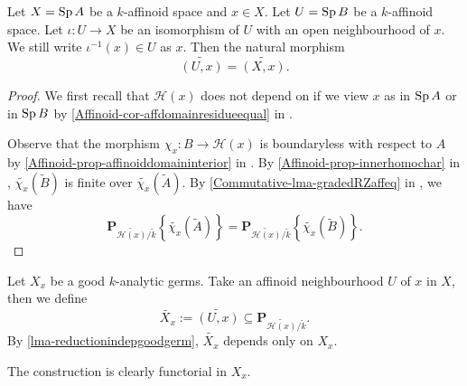 \begin{lemma}\label{lma-reductionindepgoodgerm}
    Let $X=\operatorname{Sp} A$ be a $k$-affinoid space and $x\in X$. Let $U=\operatorname{Sp} B$ be a $k$-affinoid space. Let $\iota:U\rightarrow X$ be an isomorphism of $U$ with an open neighbourhood of $x$.
    We still write $\iota^{-1}(x)\in U$ as $x$.
    Then the natural morphism
    \[
        \widetilde{(U,x)}=\widetilde{(X,x)}.     
    \]
\end{lemma}
\begin{proof}
    We first recall that  $\mathscr{H}(x)$ does not depend on if we view $x$ as in $\operatorname{Sp} A$ or in $\operatorname{Sp} B$  by \cref{Affinoid-cor-affdomainresidueequal} in . 

    Observe that the morphism $\chi_x:B\rightarrow \mathscr{H}(x)$ is boundaryless with respect to $A$ by \cref{Affinoid-prop-affinoiddomaininterior} in . By \cref{Affinoid-prop-innerhomochar}  in , $\widetilde{\chi_x}(\tilde{B})$ is finite over $\widetilde{\chi_x}(\tilde{A})$. By \cref{Commutative-lma-gradedRZaffeq} in , we have
    \[
        \mathbf{P}_{\widetilde{\mathscr{H}(x)}/\tilde{k}}\left\{ \widetilde{\chi_x}(\tilde{A})\right\}=\mathbf{P}_{\widetilde{\mathscr{H}(x)}/\tilde{k}}\left\{ \widetilde{\chi_x}(\tilde{B})\right\}.
    \]
\end{proof}

\begin{definition}
    Let $X_x$ be a good $k$-analytic germs. Take an affinoid neighbourhood $U$ of $x$ in $X$, then we define
    \[
        \widetilde{X_x}:=\widetilde{(U,x)}\subseteq \mathbf{P}_{\widetilde{\mathscr{H}(x)}/\tilde{k}}.  
    \]
    By \cref{lma-reductionindepgoodgerm}, $\widetilde{X_x}$ depends only on $X_x$.
    
    The construction is clearly functorial in $X_x$.
\end{definition}


